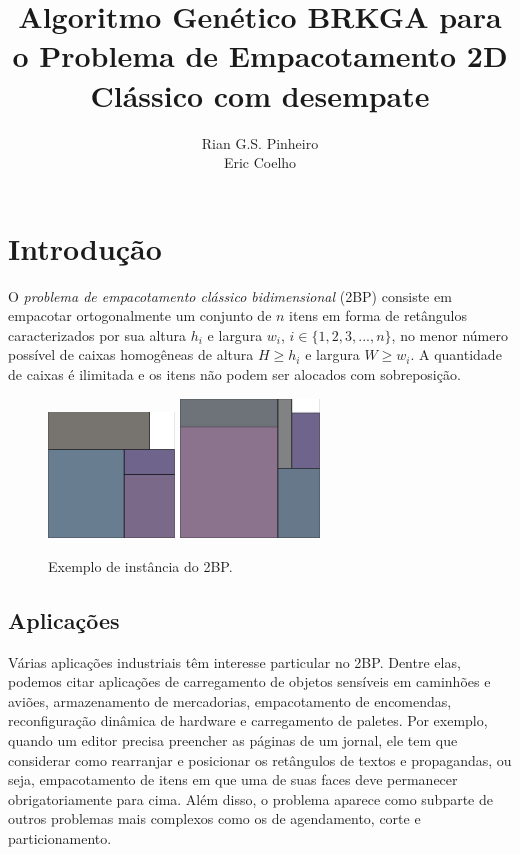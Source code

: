 \documentclass[article]{rian_article}
\author{Rian G.S. Pinheiro\\ \email{rian@ic.ufal.br}\And 
        Eric Coelho\\ \email{esc2@ic.ufal.br}}%
\title{Algoritmo Genético BRKGA para o Problema de Empacotamento 2D 	Clássico com desempate}
\begin{document}
\section{Introdução}

O \textit{problema de empacotamento clássico bidimensional} (2BP) consiste em empacotar ortogonalmente um conjunto de $n$ itens em forma de retângulos caracterizados por sua altura $h_{i}$ e largura $w_{i}$, $i \in \{1, 2, 3, ... , n\}$, no menor número possível de caixas homogêneas de altura $H \geq h_{i}$ e largura $W \geq w_{i}$. A quantidade de caixas é ilimitada e os itens não podem ser alocados com sobreposição.

\begin{figure}[hbt]
\centering
\includegraphics[width=0.3\textwidth]{figs/ex_instance_1.png}\hspace{0.1\textwidth}
\includegraphics[width=0.33\textwidth]{figs/ex_instance_2.png}
\caption{Exemplo de instância do 2BP.} \label{fig:ex}
\end{figure}

\subsection{Aplicações}
Várias aplicações industriais têm interesse particular no 2BP. Dentre elas, podemos citar aplicações de carregamento de objetos sensíveis em caminhões e aviões, armazenamento de mercadorias, empacotamento de encomendas, reconfiguração dinâmica de hardware e carregamento de paletes. Por exemplo, quando um editor precisa preencher as páginas de um jornal, ele tem que considerar como rearranjar e posicionar os retângulos de textos e propagandas, ou seja, empacotamento de itens em que uma de suas faces deve permanecer obrigatoriamente para cima. Além disso, o problema aparece como subparte de outros problemas mais complexos como os de agendamento, corte e particionamento.\citep{zudio2019}
\end{document}
